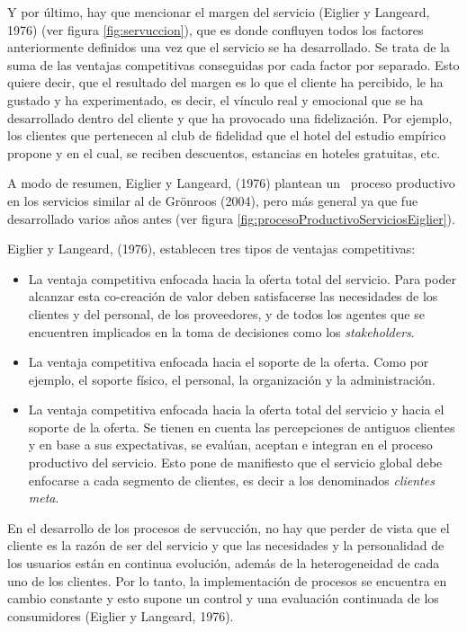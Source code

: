 Y por último, hay que mencionar el margen del servicio (Eiglier y Langeard, 1976) (ver figura \ref{fig:servuccion}), que es donde confluyen todos los factores anteriormente definidos una vez que el servicio se ha desarrollado. Se trata de la suma de las ventajas competitivas conseguidas por cada factor por separado. Esto quiere decir, que el resultado del margen es lo que el cliente ha percibido, le ha gustado y ha experimentado, es decir, el vínculo real y emocional que se ha desarrollado dentro del cliente y que ha provocado una fidelización. Por ejemplo, los clientes que pertenecen al club de fidelidad que el hotel del estudio empírico propone y en el cual, se reciben descuentos, estancias en hoteles gratuitas, etc.

A modo de resumen, Eiglier y Langeard, (1976) plantean un  proceso productivo en los servicios similar al de Grönroos (2004), pero más general ya que fue desarrollado varios años antes (ver figura \ref{fig:procesoProductivoServiciosEiglier}).

Eiglier y Langeard, (1976), establecen tres tipos de ventajas competitivas: 

\begin{itemize} 
			\item La ventaja competitiva enfocada hacia la oferta total del servicio. Para poder alcanzar esta co-creación de valor deben satisfacerse las necesidades de los clientes y del personal, de los proveedores, y de todos los agentes que se encuentren implicados en la toma de decisiones como los \emph{stakeholders}. 
			\item La ventaja competitiva enfocada hacia el soporte de la oferta. Como por ejemplo, el soporte físico, el personal, la organización y la administración. 
			\item La ventaja competitiva enfocada hacia la oferta total del servicio y hacia el soporte de la oferta. Se tienen en cuenta las percepciones de antiguos clientes y en base a sus expectativas, se evalúan, aceptan e integran en el proceso productivo del servicio. Esto pone de manifiesto que el servicio global debe enfocarse a cada segmento de clientes, es decir a los denominados \emph{clientes meta}. 

\end{itemize}

En el desarrollo de los procesos de servucción, no hay que perder de vista que el cliente es la razón de ser del servicio y que las necesidades y la personalidad de los usuarios están en continua evolución, además de la heterogeneidad de cada uno de los clientes. Por lo tanto, la implementación de procesos se encuentra en cambio constante y esto supone un control y una evaluación continuada de los consumidores (Eiglier y Langeard, 1976).

